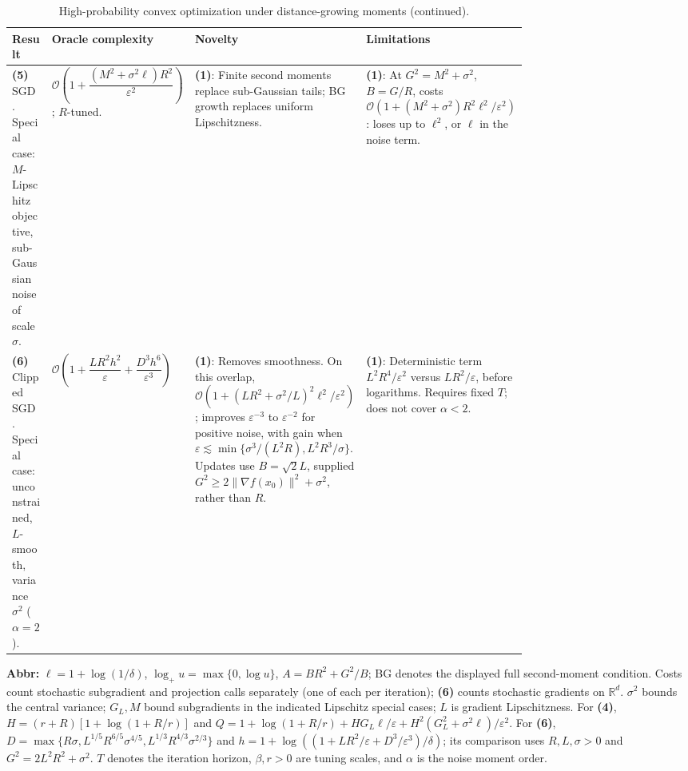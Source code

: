 \begin{table}[tp]
\centering
\addtocounter{table}{-1}
\caption{High-probability convex optimization under distance-growing moments (continued).}
\begin{threeparttable}
\footnotesize
\setlength{\tabcolsep}{4pt}\renewcommand{\arraystretch}{1.18}
\begin{tabularx}{\linewidth}{@{}>{\raggedright\arraybackslash}p{0.18\linewidth}>{\raggedright\arraybackslash}p{0.32\linewidth}>{\raggedright\arraybackslash}p{0.25\linewidth}>{\raggedright\arraybackslash}X@{}}
\toprule
\textbf{Result} & \textbf{Oracle complexity} & \textbf{Novelty} & \textbf{Limitations} \\
\midrule
\textbf{(5)} SGD \citep[Thm.~3.5]{bscLiuZhou2026v4}. Special case: $M$-Lipschitz objective, sub-Gaussian noise of scale $\sigma$.
& $\mathcal{O}\!\left(1+\dfrac{(M^2+\sigma^2\ell)R^2}{\varepsilon^2}\right)$; $R$-tuned.
& \textbf{(1)}: Finite second moments replace sub-Gaussian tails; BG growth replaces uniform Lipschitzness.
& \textbf{(1)}: At $G^2=M^2+\sigma^2$, $B=G/R$, costs $\mathcal{O}(1+(M^2+\sigma^2)R^2\ell^2/\varepsilon^2)$: loses up to $\ell^2$, or $\ell$ in the noise term. \\
\midrule
\textbf{(6)} Clipped SGD \citep[Thm.~1, Cor.~1]{tcCPPG2026}. Special case: unconstrained, $L$-smooth, variance $\sigma^2$ ($\alpha=2$).
& $\mathcal{O}\!\left(1+\dfrac{LR^2h^2}{\varepsilon}+\dfrac{D^3h^6}{\varepsilon^3}\right)$
& \textbf{(1)}: Removes smoothness. On this overlap, $\mathcal{O}(1+(LR^2+\sigma^2/L)^2\ell^2/\varepsilon^2)$; improves $\varepsilon^{-3}$ to $\varepsilon^{-2}$ for positive noise, with gain when $\varepsilon\lesssim\min\{\sigma^3/(L^2R),L^2R^3/\sigma\}$. Updates use $B=\sqrt2L$, supplied $G^2\ge2\|\nabla f(x_0)\|^2+\sigma^2$, rather than $R$.
& \textbf{(1)}: Deterministic term $L^2R^4/\varepsilon^2$ versus $LR^2/\varepsilon$, before logarithms. Requires fixed $T$; does not cover $\alpha<2$. \\
\bottomrule
\end{tabularx}
\begin{tablenotes}[flushleft]\footnotesize
\item[] \textbf{Abbr:} $\ell=1+\log(1/\delta)$, $\log_+u=\max\{0,\log u\}$, $A=BR^2+G^2/B$; BG denotes the displayed full second-moment condition. Costs count stochastic subgradient and projection calls separately (one of each per iteration); \textbf{(6)} counts stochastic gradients on $\mathbb R^d$. $\sigma^2$ bounds the central variance; $G_L,M$ bound subgradients in the indicated Lipschitz special cases; $L$ is gradient Lipschitzness. For \textbf{(4)}, $H=(r+R)[1+\log(1+R/r)]$ and $Q=1+\log(1+R/r)+HG_L\ell/\varepsilon+H^2(G_L^2+\sigma^2\ell)/\varepsilon^2$. For \textbf{(6)}, $D=\max\{R\sigma,L^{1/5}R^{6/5}\sigma^{4/5},L^{1/3}R^{4/3}\sigma^{2/3}\}$ and $h=1+\log((1+LR^2/\varepsilon+D^3/\varepsilon^3)/\delta)$; its comparison uses $R,L,\sigma>0$ and $G^2=2L^2R^2+\sigma^2$. $T$ denotes the iteration horizon, $\beta,r>0$ are tuning scales, and $\alpha$ is the noise moment order.
\end{tablenotes}
\end{threeparttable}
\end{table}
\clearpage
